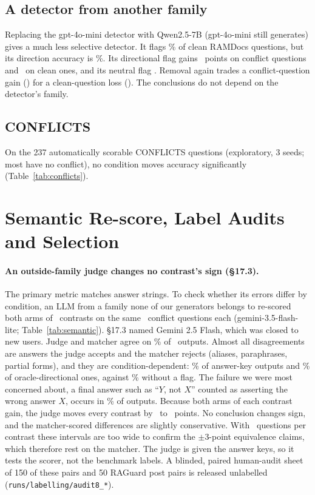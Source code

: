 \subsection{A detector from another family}
Replacing the gpt-4o-mini detector with Qwen2.5-7B (gpt-4o-mini still generates) gives a much less selective
detector. It flags \qdetFpr\% of clean RAMDocs questions, but its direction accuracy is \qdetDir\%. Its directional
flag gains \zQDetLlmDirFlagDirectionalConflict\ points on conflict questions and \zQDetLlmDirFlagDirectionalClean\ on
clean ones, and its neutral flag \zQDetLlmDirFlagConflict. Removal again trades a conflict-question gain
(\zQDetLlmDirRemoveSuspectConflict) for a clean-question loss (\zQDetLlmDirRemoveSuspectClean). The conclusions do
not depend on the detector's family.

\subsection{CONFLICTS}
On the 237 automatically scorable CONFLICTS questions (exploratory, 3 seeds; most have no conflict), no condition
moves accuracy significantly (Table~\ref{tab:conflicts}).

\section{Semantic Re-score, Label Audits and Selection}
\label{app:semantic}

\paragraph{An outside-family judge changes no contrast's sign (\S17.3).} The primary metric matches answer strings. To
check whether its errors differ by condition, an LLM from a family none of our generators belongs to re-scored both
arms of \semK\ contrasts on the same \semNq\ conflict questions each (gemini-3.5-flash-lite; Table~\ref{tab:semantic}).
\S17.3 named Gemini 2.5 Flash, which was closed to new users. Judge and matcher agree on \semAgree\% of \semN\ outputs. Almost all
disagreements are answers the judge accepts and the matcher rejects (aliases, paraphrases, partial forms), and they
are condition-dependent: \semJudgeOnlyKey\% of answer-key outputs and \semJudgeOnlyDir\% of oracle-directional ones,
against \semJudgeOnlyPlain\% without a flag. The failure we were most concerned about, a final answer such as
``$Y$, not $X$'' counted as asserting the wrong answer $X$, occurs in \semRejected\% of outputs. Because
both arms of each contrast gain, the judge moves every contrast by \semDidMin\ to \semDidMax\ points. No conclusion
changes sign, and the matcher-scored differences are slightly conservative. With \semNq\ questions per contrast these
intervals are too wide to confirm the $\pm$3-point equivalence claims, which therefore rest on the matcher. The
judge is given the answer keys, so it tests the scorer, not the benchmark labels. A blinded, paired human-audit sheet of
150 of these pairs and 50 RAGuard post pairs is released unlabelled (\texttt{runs/labelling/audit8\_*}).

